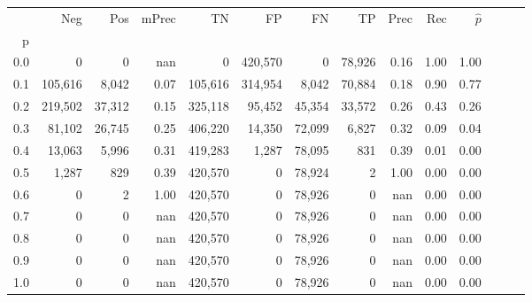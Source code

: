 \begin{tabular}{rrrrrrrrrrrrrr}
\toprule
{} &      Neg &     Pos & mPrec &       TN &       FP &      FN &      TP &  Prec &   Rec & $\hat{p}$ \\
p   &          &         &       &          &          &         &         &       &       &           \\
\midrule
0.0 &        0 &       0 &   nan &        0 &  420,570 &       0 &  78,926 &  0.16 &  1.00 &      1.00 \\
0.1 &  105,616 &   8,042 &  0.07 &  105,616 &  314,954 &   8,042 &  70,884 &  0.18 &  0.90 &      0.77 \\
0.2 &  219,502 &  37,312 &  0.15 &  325,118 &   95,452 &  45,354 &  33,572 &  0.26 &  0.43 &      0.26 \\
0.3 &   81,102 &  26,745 &  0.25 &  406,220 &   14,350 &  72,099 &   6,827 &  0.32 &  0.09 &      0.04 \\
0.4 &   13,063 &   5,996 &  0.31 &  419,283 &    1,287 &  78,095 &     831 &  0.39 &  0.01 &      0.00 \\
0.5 &    1,287 &     829 &  0.39 &  420,570 &        0 &  78,924 &       2 &  1.00 &  0.00 &      0.00 \\
0.6 &        0 &       2 &  1.00 &  420,570 &        0 &  78,926 &       0 &   nan &  0.00 &      0.00 \\
0.7 &        0 &       0 &   nan &  420,570 &        0 &  78,926 &       0 &   nan &  0.00 &      0.00 \\
0.8 &        0 &       0 &   nan &  420,570 &        0 &  78,926 &       0 &   nan &  0.00 &      0.00 \\
0.9 &        0 &       0 &   nan &  420,570 &        0 &  78,926 &       0 &   nan &  0.00 &      0.00 \\
1.0 &        0 &       0 &   nan &  420,570 &        0 &  78,926 &       0 &   nan &  0.00 &      0.00 \\
\bottomrule
\end{tabular}
